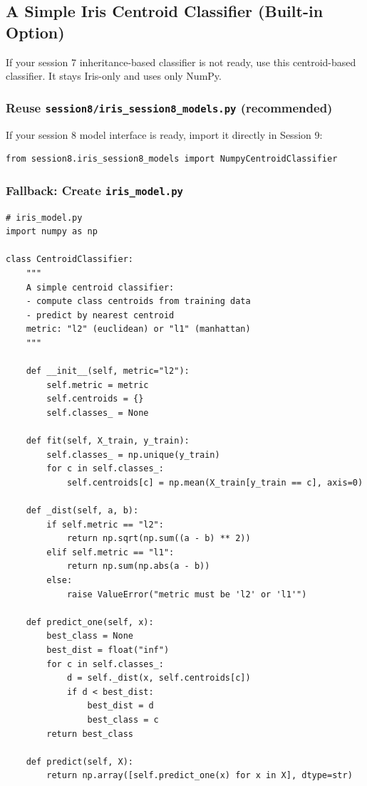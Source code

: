 \newpage
\subsection{A Simple Iris Centroid Classifier (Built-in Option)}
\label{sec:simple_centroid_classifier}

If your session 7 inheritance-based classifier is not ready, use this centroid-based classifier.
It stays Iris-only and uses only NumPy.

\subsubsection{Reuse \texttt{session8/iris\_session8\_models.py} (recommended)}
\noindent
If your session 8 model interface is ready, import it directly in Session 9:
\begin{verbatim}
from session8.iris_session8_models import NumpyCentroidClassifier
\end{verbatim}

\subsubsection{Fallback: Create \texttt{iris\_model.py}}
\begin{verbatim}
# iris_model.py
import numpy as np

class CentroidClassifier:
    """
    A simple centroid classifier:
    - compute class centroids from training data
    - predict by nearest centroid
    metric: "l2" (euclidean) or "l1" (manhattan)
    """

    def __init__(self, metric="l2"):
        self.metric = metric
        self.centroids = {}
        self.classes_ = None

    def fit(self, X_train, y_train):
        self.classes_ = np.unique(y_train)
        for c in self.classes_:
            self.centroids[c] = np.mean(X_train[y_train == c], axis=0)

    def _dist(self, a, b):
        if self.metric == "l2":
            return np.sqrt(np.sum((a - b) ** 2))
        elif self.metric == "l1":
            return np.sum(np.abs(a - b))
        else:
            raise ValueError("metric must be 'l2' or 'l1'")

    def predict_one(self, x):
        best_class = None
        best_dist = float("inf")
        for c in self.classes_:
            d = self._dist(x, self.centroids[c])
            if d < best_dist:
                best_dist = d
                best_class = c
        return best_class

    def predict(self, X):
        return np.array([self.predict_one(x) for x in X], dtype=str)
\end{verbatim}

